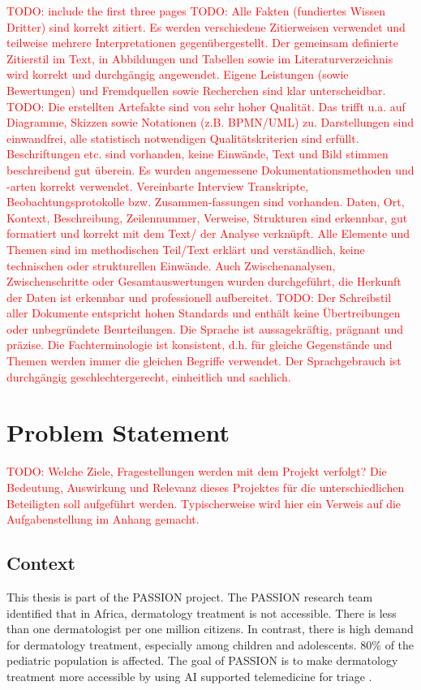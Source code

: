 \documentclass[a4paper,10.5pt,
			   bindingoffset=0.2in,left=3.35cm,right=2.12cm,top=3.75cm,bottom=2.88cm,%
				footskip=.25in
				listof=numbered,toc=chapterentrywithdots]{scrreport}
\renewcommand{\todo}[1]{\textcolor{red}{TODO: #1}}
\begin{document}
	\todo{include the first three pages}
	\todo{Alle Fakten (fundiertes Wissen Dritter) sind korrekt zitiert. Es werden verschiedene Zitierweisen verwendet und teilweise mehrere Interpretationen gegenübergestellt. Der gemeinsam definierte Zitierstil im Text, in Abbildungen und Tabellen sowie im Literaturverzeichnis wird korrekt und durchgängig angewendet. Eigene Leistungen (sowie Bewertungen) und Fremdquellen sowie Recherchen sind klar unterscheidbar.} \linebreak
	\todo{Die erstellten Artefakte sind von sehr hoher Qualität. Das trifft u.a. auf Diagramme, Skizzen sowie Notationen (z.B. BPMN/UML) zu. Darstellungen sind einwandfrei, alle statistisch notwendigen Qualitätskriterien sind erfüllt. Beschriftungen etc. sind vorhanden, keine Einwände, Text und Bild stimmen beschreibend gut überein. Es wurden angemessene Dokumentationsmethoden und -arten korrekt verwendet. Vereinbarte Interview Transkripte, Beobachtungsprotokolle bzw. Zusammen-fassungen sind vorhanden. Daten, Ort, Kontext, Beschreibung, Zeilennummer, Verweise, Strukturen sind erkennbar, gut formatiert und korrekt mit dem Text/ der Analyse verknüpft. Alle Elemente und Themen sind im methodischen Teil/Text erklärt und verständlich, keine technischen oder strukturellen Einwände. Auch Zwischenanalysen, Zwischenschritte oder Gesamtauswertungen wurden durchgeführt, die Herkunft der Daten ist erkennbar und professionell aufbereitet.} \linebreak
	\todo{Der Schreibstil aller Dokumente entspricht hohen Standards und enthält keine Übertreibungen oder unbegründete Beurteilungen. Die Sprache ist aussagekräftig, prägnant und präzise. Die Fachterminologie ist konsistent, d.h. für gleiche Gegenstände und Themen werden immer die gleichen Begriffe verwendet. Der Sprachgebrauch ist durchgängig geschlechtergerecht, einheitlich und sachlich.}
	
	
	\chapter{Problem Statement}
		\todo{Welche Ziele, Fragestellungen werden mit dem Projekt verfolgt? Die Bedeutung, Auswirkung und Relevanz	dieses Projektes für die unterschiedlichen Beteiligten soll aufgeführt werden. Typischerweise wird hier ein Verweis auf die Aufgabenstellung im Anhang gemacht.}
	
		\section{Context}
			This thesis is part of the PASSION project. The PASSION research team identified that in Africa, dermatology treatment is not accessible. There is less than one dermatologist per one million citizens. In contrast, there is high demand for dermatology treatment, especially among children and adolescents. 80\% of the \gls{pediatric} population is affected. The goal of PASSION is to make dermatology treatment more accessible by using AI supported telemedicine for triage \autocite{Gottfrois2024}.
		
\end{document}
